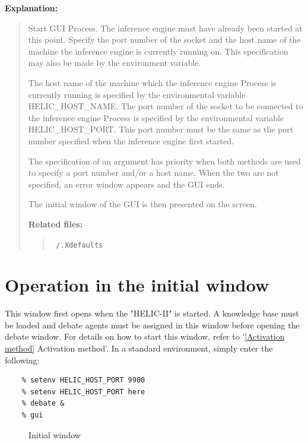{\bf Explanation:}
\begin{quote}
Start GUI Process.
The inference engine must have already been started at this point.
Specify the port number of the socket and the host name of the machine the inference engine is currently running on.
This specification may also be made by the environment variable.

The host name of the machine which the inference engine Process is currently running is specified by the environmental variable HELIC\_HOST\_NAME.
The port number of the socket to be connected to the inference engine Process is specified by the environmental variable HELIC\_HOST\_PORT.
This port number must be the same as the port number specified when the inference engine first started. 

The specification of an argument has priority when both methods are used to specify a port number and/or a host name.  When the two are not specified, an error window appears and the GUI ends.

The initial window of the GUI is then presented on the screen.

{\bf Related files:}

\begin{quote}
~\verb+/.Xdefaults+
\end{quote}
\end{quote}

\newpage

\section{Operation in the initial window}

This window first opens when the "HELIC-II" is started.
A knowledge base must be loaded and debate agents must be assigned in this window before opening the debate window.
For details on how to start this window, refer to '\ref{Activation method} Activation method'.
In a standard environment, simply enter the following:
\begin{verbatim}
	% setenv HELIC_HOST_PORT 9900
	% setenv HELIC_HOST_PORT here
	% debate &
	% gui
\end{verbatim}

\begin{figure}[htb]
\begin{center}
\end{center}
\caption{Initial window}\label{Initial window}
\end{figure}

